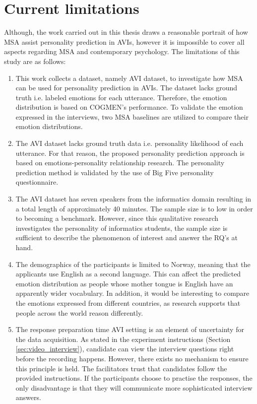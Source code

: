 \section{Current limitations}
\label{sec:current_limitations}
Although, the work carried out in this thesis draws a reasonable portrait of how MSA assist personality prediction in AVIs, however it is impossible to cover all aspects regarding MSA and contemporary psychology. The limitations of this study are as follows:
%
\begin{enumerate}
    \item This work collects a dataset, namely AVI dataset, to investigate how MSA can be used for personality prediction in AVIs. The dataset lacks ground truth i.e. labeled emotions for each utterance. Therefore, the emotion distribution is based on COGMEN's performance. To validate the emotion expressed in the interviews, two MSA baselines are utilized to compare their emotion distributions. \\
    \item The AVI dataset lacks ground truth data i.e. personality likelihood of each utterance. For that reason, the proposed personality prediction approach is based on emotions-personality relationship research. The personality prediction method is validated by the use of Big Five personality questionnaire. \\
    \item The AVI dataset has seven speakers from the informatics domain resulting in a total length of approximately 40 minutes. The sample size is to low in order to becoming a benchmark. However, since this qualitative research investigates the personality of informatics students, the sample size is sufficient to describe the phenomenon of interest and answer the RQ's at hand. \\
    \item The demographics of the participants is limited to Norway, meaning that the applicants use English as a second language. This can affect the predicted emotion distribution as people whose mother tongue is English have an apparently wider vocabulary. In addition, it would be interesting to compare the emotions expressed from different countries, as research supports that people across the world reason differently. \\
    \item The response preparation time AVI setting is an element of uncertainty for the data acquisition. As stated in the experiment instructions (Section \ref{sec:video_interview}), candidate can view the interview questions right before the recording happens. However, there exists no mechanism to ensure this principle is held. The facilitators trust that candidates follow the provided instructions. If the participants choose to practise the responses, the only disadvantage is that they will communicate more sophisticated interview answers. \\

\end{enumerate}
